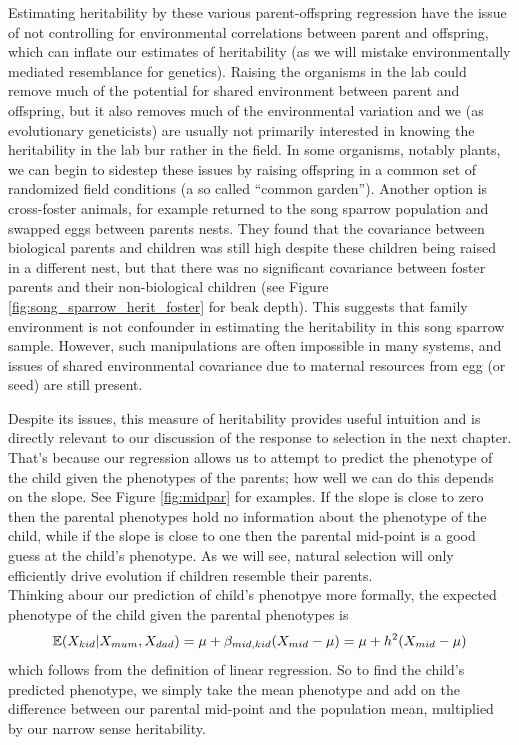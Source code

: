 Estimating heritability by these various parent-offspring regression have the issue of not controlling for
environmental correlations between parent and offspring, which can
inflate our estimates of heritability (as we will mistake
environmentally mediated resemblance for genetics). Raising the
organisms in the lab could remove much of the potential for shared
environment between parent and offspring, but it also removes much of the
environmental variation and we (as evolutionary geneticists) are usually not primarily interested in knowing
the heritability in the lab bur rather in the field. In some organisms,
notably plants, we can begin to sidestep these issues by raising offspring
in a common set of randomized field conditions (a so called ``common
garden''). Another option is cross-foster animals, for example
\citet{smith1980experimental} returned to the song sparrow population
and swapped eggs between parents nests. They found that the covariance
between biological parents and children was still high despite these
children being raised in a different nest, but that there was no significant
covariance between foster parents and their non-biological children
(see Figure \ref{fig:song_sparrow_herit_foster} for beak depth). This suggests that
family environment is not confounder in estimating the heritability in
this song sparrow sample. However, such manipulations are often
impossible in many systems, and issues of shared environmental
covariance due to maternal resources from egg (or seed) are still present. 

Despite its issues, this measure of heritability provides useful
intuition and is directly relevant to our discussion of the response to selection in
the next chapter. That's because our regression allows us to attempt to predict the phenotype of the
child given the phenotypes of the parents; how well we can do this depends on the
slope. See Figure \ref{fig:midpar} for examples. If the slope is close to zero then the parental phenotypes hold no
information about the phenotype of the child, while if the slope is
close to one then the parental mid-point is a good guess at the child's
phenotype. As we will see, natural selection will only efficiently
drive evolution if children resemble their parents.\\

Thinking abour our prediction of child's phenotpye more formally, the expected phenotype of the child given the parental
phenotypes is
\begin{equation}
\mathbb{E}(X_{kid} | X_{mum},X_{dad}) = \mu +
\beta_{mid,kid}(X_{mid} - \mu) =\mu + h^2(X_{mid} - \mu)  \label{predict_kid}
\end{equation}
which follows from the definition of linear regression. So to find the
child's predicted phenotype, we simply take the mean phenotype and add on the difference between our parental mid-point and the population mean, multiplied by our
narrow sense heritability. \\


